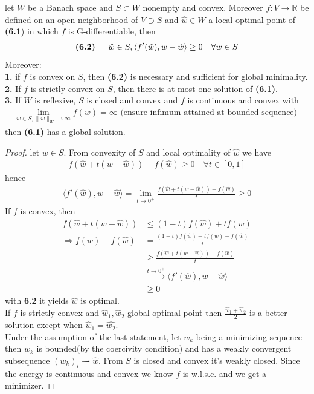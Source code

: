 \begin{theorem}
	let $W$ be a Banach space and $S \subset W$ nonempty and convex. Moreover $f: V \rightarrow \mathbb{R}$ be defined on an open neighborhood of $ V \supset S$ and $\hat{w} \in W$ a local optimal point of \textbf{(6.1}) in which $f$ is G-differentiable, then
	\begin{align*}
	\textbf{(6.2) \quad}
		\hat{w} \in S, \langle f'(\hat{w}), w - \hat{w} \rangle \geq 0 \quad \forall w \in S
	\end{align*}
	Moreover:\\
	\textbf{1. }if $f$ is convex on $S$, then \textbf{(6.2)} is necessary and sufficient for global minimality.\\
	\textbf{2. }If $f$ is strictly convex on $S$, then there is at most one solution of \textbf{(6.1)}. \\
	\textbf{3. }If $W$ is reflexive, $S$ is closed and convex and $f$ is continuous and convex with 
	\begin{align*}
		\lim_{w \in S, \|w\|_W \rightarrow \infty } f(w) = \infty
		\text{ (ensure infimum attained at bounded sequence) }
	\end{align*}
	then \textbf{(6.1)} has a global solution. 
\end{theorem}
\begin{proof}
	let $w \in S$. From convexity of $S$ and local optimality of $\hat{w}$  we have
	\begin{align*}
		f(\hat{w} + t(w - \hat{w})) - f(\hat{w}) \geq 0 \quad \forall t \in [0, 1]
	\end{align*}
	hence 
	\begin{align*}
		\langle f'(\hat{w}), w - \hat{w} \rangle = \lim_{t \rightarrow 0^+}
		\frac{f(\hat{w} + t(w - \hat{w})) - f(\hat{w}) }{t} \geq0
	\end{align*}
	If $f$ is convex, then
	\begin{align*}
		f(\hat{w} + t(w - \hat{w})) &\le (1 - t) f(\hat{w}) + t f(w)\\
		\Rightarrow
		f(w) - f(\hat{w}) &= \frac{(1 - t) f(\hat{w}) + tf(w) - f(\hat{w}) }{t}\\
		&\ge \frac{f(\hat{w} + t(w - \hat{w})) - f(\hat{w}) }{t}\\
		&\overset{t \rightarrow 0^+}{\rightarrow} \langle f'(\hat{w}), w - \hat{w} \rangle \\
		&\ge 0
	\end{align*}
	with \textbf{6.2} it yields $\hat{w}$ is optimal. \\
	If $f$ is strictly convex and $\hat{w}_1, \hat{w}_2$ global optimal point then $\frac{ \hat{w}_1 + \hat{w}_2}{2}$ is a better solution except when $\hat{w}_1 = \hat{w_2}$. \\
	Under the assumption of the last statement, let $w_k$ being a minimizing sequence then $w_k$ is bounded(by the coercivity condition) and has a weakly convergent subsequence $(w_k)_l \rightharpoonup \hat{w}$. From $S$ is closed and convex it's weakly closed. Since the energy is continuous and convex we know $f$ is w.l.s.c. and we get a minimizer. 
\end{proof}


